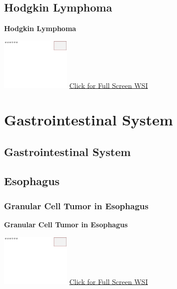\documentclass[
  letterpaper,
  paper=6in:9in,
  pagesize=pdftex,
  headinclude=on,
  footinclude=on,
  12pt]{scrbook}
\begin{document}
\hypertarget{sec-hodgkin-lymphoma}{%
\chapter{Hodgkin Lymphoma}\label{sec-hodgkin-lymphoma}}

\textbf{Hodgkin Lymphoma}

\href{https://images.patolojiatlasi.com/template/HE.html}{\includegraphics[width=0.25\textwidth,height=\textheight]{./screenshots/template_screenshot.png}}
\href{https://images.patolojiatlasi.com/hodgkin/HE.html}{Click for Full
Screen WSI}

\part{Gastrointestinal System}

\hypertarget{sec-gastrointestinal-system}{%
\chapter{Gastrointestinal System}\label{sec-gastrointestinal-system}}

\hypertarget{sec-esophagus}{%
\chapter{Esophagus}\label{sec-esophagus}}

\hypertarget{sec-esophagus-granular-cell-tumor}{%
\section{Granular Cell Tumor in
Esophagus}\label{sec-esophagus-granular-cell-tumor}}

\textbf{Granular Cell Tumor in Esophagus}

\href{https://images.patolojiatlasi.com/template/HE.html}{\includegraphics[width=0.25\textwidth,height=\textheight]{./screenshots/template_screenshot.png}}
\href{https://images.patolojiatlasi.com/granular-cell-tumor/HE.html}{Click
for Full Screen WSI}
\end{document}
